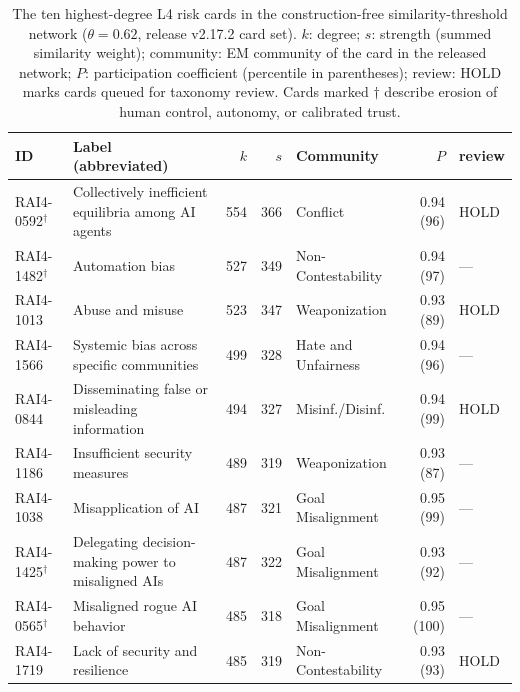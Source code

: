 \documentclass[fleqn,10pt]{wlscirep}
\begin{document}
\begin{table}[ht]
\centering
\caption{The ten highest-degree L4 risk cards in the construction-free
similarity-threshold network ($\theta=0.62$, release v2.17.2 card set).
$k$: degree; $s$: strength (summed similarity weight); community: EM
community of the card in the released network; $P$: participation
coefficient (percentile in parentheses); review: HOLD marks cards queued
for taxonomy review. Cards marked $\dagger$ describe erosion of human
control, autonomy, or calibrated trust.}
\label{tab:hubs}
\small
\begin{tabular}{llrrlrl}
\toprule
ID & Label (abbreviated) & $k$ & $s$ & Community & $P$ & review \\
\midrule
RAI4-0592$^\dagger$ & Collectively inefficient equilibria among AI agents & 554 & 366 & Conflict & 0.94 (96) & HOLD \\
RAI4-1482$^\dagger$ & Automation bias & 527 & 349 & Non-Contestability & 0.94 (97) & --- \\
RAI4-1013 & Abuse and misuse & 523 & 347 & Weaponization & 0.93 (89) & HOLD \\
RAI4-1566 & Systemic bias across specific communities & 499 & 328 & Hate and Unfairness & 0.94 (96) & --- \\
RAI4-0844 & Disseminating false or misleading information & 494 & 327 & Misinf./Disinf. & 0.94 (99) & HOLD \\
RAI4-1186 & Insufficient security measures & 489 & 319 & Weaponization & 0.93 (87) & --- \\
RAI4-1038 & Misapplication of AI & 487 & 321 & Goal Misalignment & 0.95 (99) & --- \\
RAI4-1425$^\dagger$ & Delegating decision-making power to misaligned AIs & 487 & 322 & Goal Misalignment & 0.93 (92) & --- \\
RAI4-0565$^\dagger$ & Misaligned rogue AI behavior & 485 & 318 & Goal Misalignment & 0.95 (100) & --- \\
RAI4-1719 & Lack of security and resilience & 485 & 319 & Non-Contestability & 0.93 (93) & HOLD \\
\bottomrule
\end{tabular}
\end{table}
\end{document}
